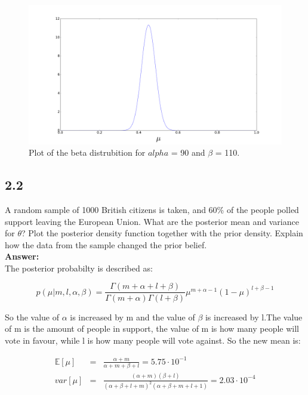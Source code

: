 \documentclass[a4paper]{article}
\begin{document}
\begin{figure}[H]
\includegraphics[width=\textwidth]{BetaPlotEx2.png}
\caption{Plot of the beta distrubition for $alpha$ = 90 and $\beta$ = 110.}
\end{figure}





\subsection*{2.2}

A random sample of 1000 British citizens is taken, and 60\% of the people polled support leaving the European Union. What are the posterior mean and variance for $\theta$? Plot the posterior density function together with the prior density. Explain how the data from the sample changed the prior belief.\\

\textbf{Answer:}\\

The posterior probabilty is described as:

\begin{equation}
p(\mu|m,l,\alpha,\beta) = \frac{\Gamma(m+\alpha+l+\beta)}{\Gamma(m+\alpha)\Gamma(l+\beta)} \mu^{m+\alpha-1}(1-\mu)^{l+\beta-1}
\end{equation}

So the value of $\alpha$ is increased by m and the value of $\beta$ is increased by l.The value of m is the amount of people in support, the value of m is how many people will vote in favour, while l is how many people will vote against. So the new mean is:

\begin{eqnarray}
\mathbb E [\mu] &=& \frac{\alpha + m}{\alpha + m + \beta + l}= 5.75 \cdot 10^{-1}\\
var[\mu]  &=& \frac{(\alpha + m ) ( \beta + l)}{(\alpha + \beta + l + m)^2(\alpha + \beta + m + l + 1 )} = 2.03\cdot 10^{-4}
\end{eqnarray}
\end{document}
